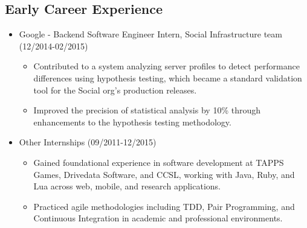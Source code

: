 
\subsection{Early Career Experience}
\begin{itemize}
    \item \footnotesize{Google - Backend Software Engineer Intern, Social Infrastructure team
        (12/2014-02/2015)}
    \begin{itemize}
        \item \scriptsize{Contributed to a system analyzing server profiles to detect performance 
            differences using hypothesis testing, which became a standard validation tool for the Social 
            org's production releases.}
        \item \scriptsize{Improved the precision of statistical analysis by 10\% through enhancements to 
            the hypothesis testing methodology.}
    \end{itemize}

    \item \footnotesize{Other Internships (09/2011-12/2015)}
    \begin{itemize}
        \item \scriptsize{Gained foundational experience in software development at TAPPS Games, 
            Drivedata Software, and CCSL, working with Java, Ruby, and Lua across web, mobile, and 
            research applications.}
        \item \scriptsize{Practiced agile methodologies including TDD, Pair Programming, and Continuous 
            Integration in academic and professional environments.}
    \end{itemize}
\end{itemize}